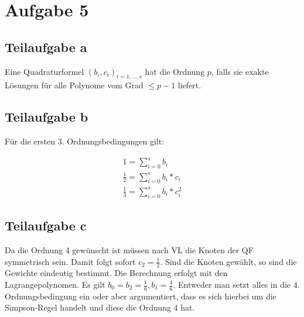 \section*{Aufgabe 5}
\subsection*{Teilaufgabe a}
Eine Quadraturformel $(b_i, c_i)_{i=1, \dots, s}$ hat die Ordnung
$p$, falls sie exakte Lösungen für alle Polynome vom Grad $\leq p -1$
liefert.

\subsection*{Teilaufgabe b}
Für die ersten 3. Ordnungsbedingungen gilt:

\begin{align*}
	1 = \sum_{i = 0}^{s} b_i \\
 	\frac{1}{2} = \sum_{i = 0}^{s} b_i * c_i \\
 	\frac{1}{3} = \sum_{i = 0}^{s} b_i * c_i^2
\end{align*}

\subsection*{Teilaufgabe c}
Da die Ordnung 4 gewünscht ist müssen nach VL die Knoten der QF symmetrisch sein. Damit folgt sofort $c_2 = \frac{1}{2}$. Sind die Knoten gewählt, so sind die Gewichte eindeutig bestimmt. Die Berechnung erfolgt mit den Lagrangepolynomen. Es gilt $b_0 = b_2 = \frac{1}{6}, b_1 = \frac{4}{6}$. Entweder man setzt alles in die 4. Ordnungsbedingung ein oder aber argumentiert, dass es sich hierbei um die Simpson-Regel handelt und diese die Ordnung 4 hat.
